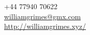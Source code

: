 \documentclass[margin,line]{resume}
\begin{document}
{
    \hfill +44 77940 70622                                           \ \Mobilefone     \vspace{0mm}\\\vspace{0mm}%
    \hfill \href{mailto:williamgrimes@gmx.com}{williamgrimes@gmx.com} \ \Letter        \vspace{0mm}\\\vspace{0mm}%
    \hfill \url{http://williamgrimes.xyz/}                        \ \ComputerMouse \vspace{0mm}\\\vspace{-10mm}%
}
\end{document}
